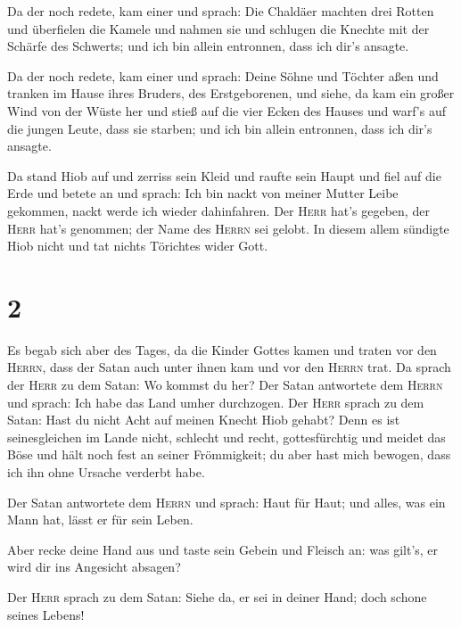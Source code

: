 Da der noch redete, kam einer und sprach: Die Chaldäer
machten drei Rotten und überfielen die Kamele und nahmen sie und
schlugen die Knechte mit der Schärfe des Schwerts; und ich bin allein
entronnen, dass ich dir's ansagte.

 Da der noch redete, kam einer und sprach: Deine Söhne
und Töchter aßen und tranken im Hause ihres Bruders, des Erstgeborenen,
 und siehe, da kam ein großer Wind von der Wüste her und
stieß auf die vier Ecken des Hauses und warf's auf die jungen Leute,
dass sie starben; und ich bin allein entronnen, dass ich dir's ansagte.

 Da stand Hiob auf und zerriss sein Kleid und raufte sein
Haupt und fiel auf die Erde und betete an  und sprach:
Ich bin nackt von meiner Mutter Leibe gekommen, nackt werde ich wieder
dahinfahren. Der \textsc{Herr} hat's gegeben, der \textsc{Herr} hat's
genommen; der Name des \textsc{Herrn} sei gelobt.  In
diesem allem sündigte Hiob nicht und tat nichts Törichtes wider Gott.

\hypertarget{section-1}{%
\section{2}\label{section-1}}

 Es begab sich aber des Tages, da die Kinder Gottes kamen
und traten vor den \textsc{Herrn}, dass der Satan auch unter ihnen kam
und vor den \textsc{Herrn} trat.  Da sprach der
\textsc{Herr} zu dem Satan: Wo kommst du her? Der Satan antwortete dem
\textsc{Herrn} und sprach: Ich habe das Land umher durchzogen.
 Der \textsc{Herr} sprach zu dem Satan: Hast du nicht Acht
auf meinen Knecht Hiob gehabt? Denn es ist seinesgleichen im Lande
nicht, schlecht und recht, gottesfürchtig und meidet das Böse und hält
noch fest an seiner Frömmigkeit; du aber hast mich bewogen, dass ich ihn
ohne Ursache verderbt habe.

 Der Satan antwortete dem \textsc{Herrn} und sprach: Haut
für Haut; und alles, was ein Mann hat, lässt er für sein Leben.

 Aber recke deine Hand aus und taste sein Gebein und
Fleisch an: was gilt's, er wird dir ins Angesicht absagen?

 Der \textsc{Herr} sprach zu dem Satan: Siehe da, er sei
in deiner Hand; doch schone seines Lebens!

